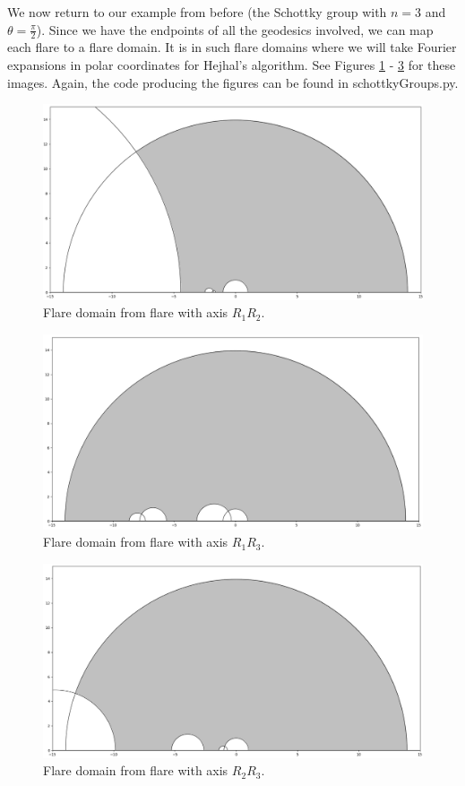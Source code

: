 \documentclass[]{article}
\begin{document}
We now return to our example from before (the Schottky group with $n = 3$ and $\theta = \frac{\pi}{2}$).
Since we have the endpoints of all the geodesics involved, we can map each flare to a flare domain.
It is in such flare domains where we will take Fourier expansions in polar coordinates for Hejhal's algorithm.
See Figures \ref{flare_R1R2} - \ref{flare_R2R3} for these images.
Again, the code producing the figures can be found in schottkyGroups.py.
\begin{figure}[h]
	\centering
	\includegraphics[width=\linewidth]{flare_R1R2.png}
	\caption{Flare domain from flare with axis $R_1R_2$.}
	\label{flare_R1R2}
\end{figure}
\begin{figure}[h]
	\centering
	\includegraphics[width=\linewidth]{flare_R1R3.png}
	\caption{Flare domain from flare with axis $R_1R_3$.}
	\label{flare_R1R3}
\end{figure}
\begin{figure}[h]
	\centering
	\includegraphics[width=\linewidth]{flare_R2R3.png}
	\caption{Flare domain from flare with axis $R_2R_3$.}
	\label{flare_R2R3}
\end{figure}
\end{document}
